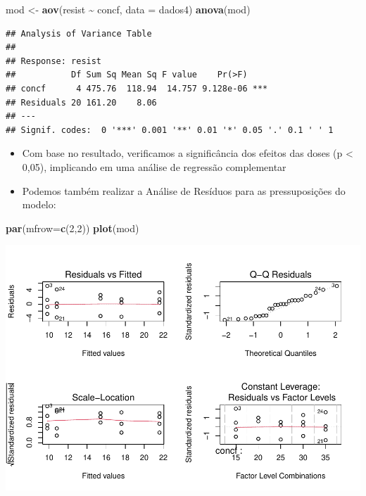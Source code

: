 \documentclass[
]{book}
\newenvironment{Shaded}{\begin{snugshade}}{\end{snugshade}}
\newcommand{\AttributeTok}[1]{\textcolor[rgb]{0.13,0.29,0.53}{#1}}
\newcommand{\DecValTok}[1]{\textcolor[rgb]{0.00,0.00,0.81}{#1}}
\newcommand{\FunctionTok}[1]{\textcolor[rgb]{0.13,0.29,0.53}{\textbf{#1}}}
\newcommand{\NormalTok}[1]{#1}
\newcommand{\OtherTok}[1]{\textcolor[rgb]{0.56,0.35,0.01}{#1}}
\newcommand{\SpecialCharTok}[1]{\textcolor[rgb]{0.81,0.36,0.00}{\textbf{#1}}}
\begin{document}
\begin{Shaded}
\begin{Highlighting}[]
\NormalTok{mod }\OtherTok{\textless{}{-}} \FunctionTok{aov}\NormalTok{(resist }\SpecialCharTok{\textasciitilde{}}\NormalTok{ concf, }\AttributeTok{data =}\NormalTok{ dados4)}
\FunctionTok{anova}\NormalTok{(mod)}
\end{Highlighting}
\end{Shaded}

\begin{verbatim}
## Analysis of Variance Table
## 
## Response: resist
##           Df Sum Sq Mean Sq F value    Pr(>F)    
## concf      4 475.76  118.94  14.757 9.128e-06 ***
## Residuals 20 161.20    8.06                      
## ---
## Signif. codes:  0 '***' 0.001 '**' 0.01 '*' 0.05 '.' 0.1 ' ' 1
\end{verbatim}

\begin{itemize}
\item
  Com base no resultado, verificamos a significância dos efeitos das doses (p \textless{} 0,05), implicando em uma análise de regressão complementar
\item
  Podemos também realizar a Análise de Resíduos para as pressuposições do modelo:
\end{itemize}

\begin{Shaded}
\begin{Highlighting}[]
\FunctionTok{par}\NormalTok{(}\AttributeTok{mfrow=}\FunctionTok{c}\NormalTok{(}\DecValTok{2}\NormalTok{,}\DecValTok{2}\NormalTok{))}
\FunctionTok{plot}\NormalTok{(mod)}
\end{Highlighting}
\end{Shaded}

\includegraphics{_main_files/figure-latex/pres2-1.pdf}
\end{document}
